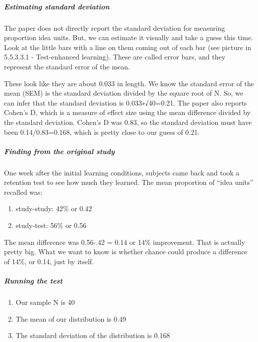 \documentclass[
]{book}
\begin{document}
\hypertarget{estimating-standard-deviation}{%
\subparagraph{Estimating standard deviation}\label{estimating-standard-deviation}}

The paper does not directly report the standard deviation for measuring proportion idea units. But, we can estimate it visually and take a guess this time. Look at the little bars with a line on them coming out of each bar (see picture in 5.5.3.3.1 - Test-enhanced learning). These are called error bars, and they represent the standard error of the mean.

These look like they are about 0.033 in length. We know the standard error of the mean (SEM) is the standard deviation divided by the square root of N. So, we can infer that the standard deviation is 0.033∗√40=0.21. The paper also reports Cohen's D, which is a measure of effect size using the mean difference divided by the standard deviation. Cohen's D was 0.83, so the standard deviation must have been 0.14/0.83=0.168, which is pretty close to our guess of 0.21.

\hypertarget{finding-from-the-original-study}{%
\subparagraph{Finding from the original study}\label{finding-from-the-original-study}}

One week after the initial learning conditions, subjects came back and took a retention test to see how much they learned. The mean proportion of ``idea units'' recalled was:

\begin{enumerate}
\def\labelenumi{\arabic{enumi}.}
\item
  study-study: 42\% or 0.42
\item
  study-test: 56\% or 0.56
\end{enumerate}

The mean difference was 0.56-.42 = 0.14 or 14\% improvement. That is actually pretty big. What we want to know is whether chance could produce a difference of 14\%, or 0.14, just by itself.

\hypertarget{running-the-test}{%
\subparagraph{Running the test}\label{running-the-test}}

\begin{enumerate}
\def\labelenumi{\arabic{enumi}.}
\item
  Our sample N is 40
\item
  The mean of our distribution is 0.49
\item
  The standard deviation of the distribution is 0.168
\end{enumerate}
\end{document}
